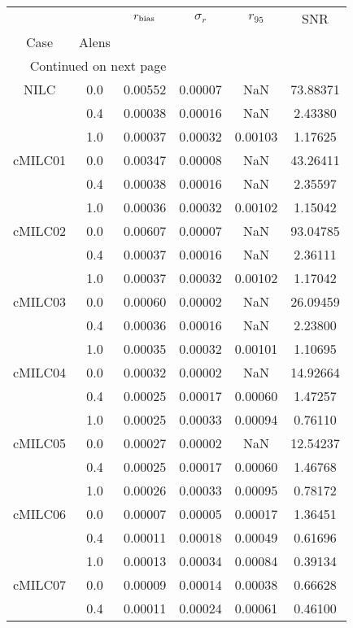 \begin{longtable}{cccccc}
\toprule
     &     &  $r_{\rm bias}$  &  $\sigma_r$ &  $r_{95}$ &      SNR \\
Case & Alens &                  &             &           &          \\
\midrule
\endhead
\midrule
\multicolumn{3}{r}{{Continued on next page}} \\
\midrule
\endfoot

\bottomrule
\endlastfoot
NILC & 0.0 & 0.00552 & 0.00007 & NaN & 73.88371 \\
     & 0.4 & 0.00038 & 0.00016 & NaN & 2.43380 \\
     & 1.0 & 0.00037 & 0.00032 & 0.00103 & 1.17625 \\
cMILC01 & 0.0 & 0.00347 & 0.00008 & NaN & 43.26411 \\
     & 0.4 & 0.00038 & 0.00016 & NaN & 2.35597 \\
     & 1.0 & 0.00036 & 0.00032 & 0.00102 & 1.15042 \\
cMILC02 & 0.0 & 0.00607 & 0.00007 & NaN & 93.04785 \\
     & 0.4 & 0.00037 & 0.00016 & NaN & 2.36111 \\
     & 1.0 & 0.00037 & 0.00032 & 0.00102 & 1.17042 \\
cMILC03 & 0.0 & 0.00060 & 0.00002 & NaN & 26.09459 \\
     & 0.4 & 0.00036 & 0.00016 & NaN & 2.23800 \\
     & 1.0 & 0.00035 & 0.00032 & 0.00101 & 1.10695 \\
cMILC04 & 0.0 & 0.00032 & 0.00002 & NaN & 14.92664 \\
     & 0.4 & 0.00025 & 0.00017 & 0.00060 & 1.47257 \\
     & 1.0 & 0.00025 & 0.00033 & 0.00094 & 0.76110 \\
cMILC05 & 0.0 & 0.00027 & 0.00002 & NaN & 12.54237 \\
     & 0.4 & 0.00025 & 0.00017 & 0.00060 & 1.46768 \\
     & 1.0 & 0.00026 & 0.00033 & 0.00095 & 0.78172 \\
cMILC06 & 0.0 & 0.00007 & 0.00005 & 0.00017 & 1.36451 \\
     & 0.4 & 0.00011 & 0.00018 & 0.00049 & 0.61696 \\
     & 1.0 & 0.00013 & 0.00034 & 0.00084 & 0.39134 \\
cMILC07 & 0.0 & 0.00009 & 0.00014 & 0.00038 & 0.66628 \\
     & 0.4 & 0.00011 & 0.00024 & 0.00061 & 0.46100 \\

\end{longtable}
